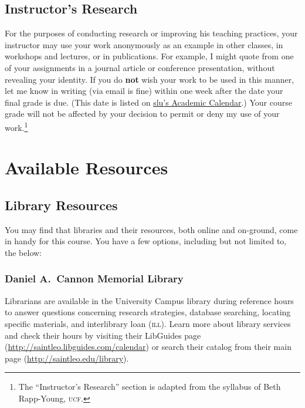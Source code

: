 \documentclass[12pt,oneside]{amsart}	%
\begin{document}
\subsection{Instructor's Research} %
\label{sub:instructor_s_research}
For the purposes of conducting research or improving his teaching practices, your instructor may use your work anonymously as an example in other classes, in workshops and lectures, or in publications. For example, I might quote from one of your assignments in a journal article or conference presentation, without revealing your identity. If you do \textbf{not} wish your work to be used in this manner, let me know in writing (via email is fine) within one week after the date your final grade is due. (This date is listed on \href{http://www.saintleo.edu/resources/academic-catalogs-schedules-calendars.aspx}{\ac{slu}'s Academic Calendar}.) Your course grade will not be affected by your decision to permit or deny my use of your work.\footnote{The ``Instructor's Research'' section is adapted from the syllabus of Beth Rapp-Young, \textsc{ucf}.}


\section{Available Resources} %
\label{sec:available_resources}
\subsection{Library Resources} %
\label{sub:library_resources}
You may find that libraries and their resources, both online and on-ground, come in handy for this course. You have a few options, including but not limited to, the below:

\subsubsection{Daniel A.\ Cannon Memorial Library} %
\label{ssub:cannon_memorial_library}
Librarians are available in the University Campus library during reference hours to answer questions concerning research strategies, database searching, locating specific materials, and interlibrary loan (\textsc{ill}). Learn more about library services and check their hours by visiting their LibGuides page (\href{http://saintleo.libguides.com/calendar}{http://saintleo.libguides.com/calendar}) or search their catalog from their main page (\href{http://saintleo.edu/library}{http://saintleo.edu/library}).
\end{document}
